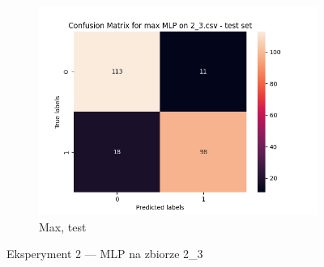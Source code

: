 \documentclass[12pt]{article}
\newcommand*{\subfigwidth}{0.24\textwidth}
\begin{document}
\begin{figure}[H]
\begin{subfigure}[t]{\subfigwidth}
        \includegraphics[width=\linewidth]{img/exp_2/mlp/2_3/max/test_matrix.png}
        \caption{Max, test}
    \end{subfigure} 
    
    \caption{Eksperyment 2 --- MLP na zbiorze 2\_3}
\end{figure}
\end{document}
